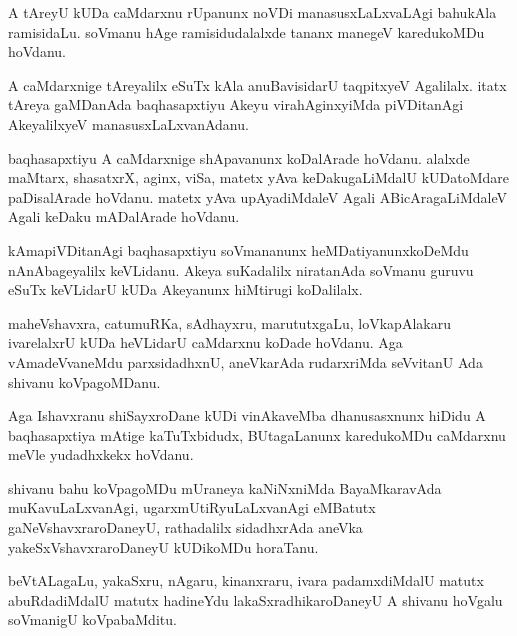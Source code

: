 \documentclass{article}
\begin{document}
\begin{mn}
A tAreyU kUDa caMdarxnu rUpanunx noVDi manasusxLaLxvaLAgi bahukAla
ramisidaLu. soVmanu hAge ramisidudalalxde tananx manegeV karedukoMDu hoVdanu.
\end{mn}

\begin{mn}
A caMdarxnige tAreyalilx eSuTx kAla anuBavisidarU taqpitxyeV
Agalilalx. itatx tAreya gaMDanAda baqhasapxtiyu Akeyu virahAginxyiMda
piVDitanAgi AkeyalilxyeV manasusxLaLxvanAdanu.
\end{mn}

\begin{mn}%
baqhasapxtiyu A caMdarxnige shApavanunx koDalArade hoVdanu. alalxde
maMtarx, shasatxrX, aginx, viSa, matetx yAva keDakugaLiMdalU
kUDatoMdare paDisalArade hoVdanu. matetx yAva upAyadiMdaleV Agali
ABicAragaLiMdaleV Agali keDaku mADalArade hoVdanu.
\end{mn}

\begin{mn}
kAmapiVDitanAgi baqhasapxtiyu soVmananunx heMDatiyanunxkoDeMdu
nAnAbageyalilx keVLidanu. Akeya suKadalilx niratanAda soVmanu guruvu
eSuTx keVLidarU kUDa Akeyanunx hiMtirugi koDalilalx.
\end{mn}

\begin{mn}
maheVshavxra, catumuRKa, sAdhayxru, marututxgaLu, loVkapAlakaru
ivarelalxrU kUDa heVLidarU caMdarxnu koDade hoVdanu. Aga
vAmadeVvaneMdu parxsidadhxnU, aneVkarAda rudarxriMda seVvitanU Ada
shivanu koVpagoMDanu.
\end{mn}

\begin{mn}%
Aga Ishavxranu shiSayxroDane kUDi vinAkaveMba dhanusasxnunx hiDidu A
baqhasapxtiya mAtige kaTuTxbidudx, BUtagaLanunx karedukoMDu caMdarxnu
meVle yudadhxkekx hoVdanu.
\end{mn}

\begin{mn}%
shivanu bahu koVpagoMDu mUraneya kaNiNxniMda BayaMkaravAda
muKavuLaLxvanAgi, ugarxmUtiRyuLaLxvanAgi eMBatutx
gaNeVshavxraroDaneyU, rathadalilx sidadhxrAda aneVka
yakeSxVshavxraroDaneyU kUDikoMDu horaTanu.
\end{mn}

\begin{mn}
beVtALagaLu, yakaSxru, nAgaru, kinanxraru, ivara padamxdiMdalU matutx
abuRdadiMdalU matutx hadineYdu lakaSxradhikaroDaneyU A shivanu hoVgalu
soVmanigU koVpabaMditu.
\end{mn}
\end{document}
